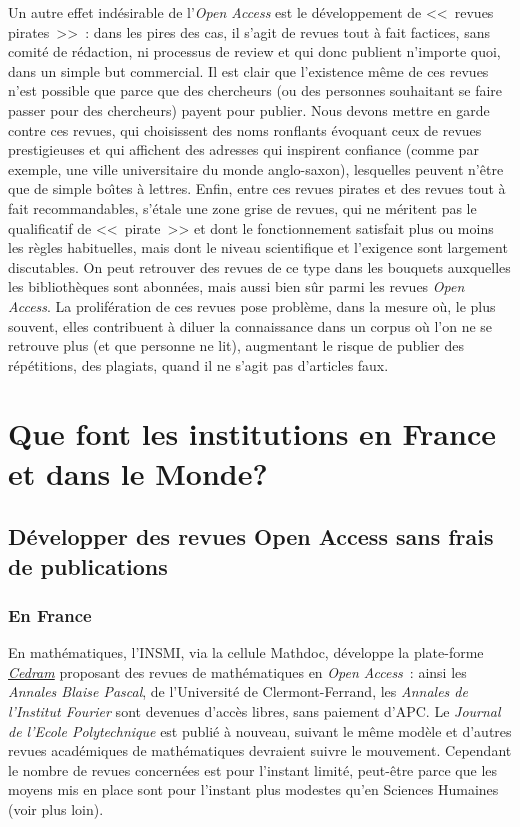 Un autre effet ind{\'e}sirable de l'\emph{Open Access} est le d{\'e}veloppement de <<~revues pirates~>>~: dans les pires des cas, il s'agit de revues tout {\`a} fait
factices, sans comit{\'e} de r{\'e}daction, ni processus de review et qui donc publient n'importe quoi, dans un simple but commercial. Il est clair que
l'existence m{\^e}me de ces revues n'est possible que parce que des chercheurs (ou des personnes souhaitant se faire passer pour des chercheurs) payent
pour publier. Nous devons mettre en garde contre ces revues, qui choisissent des noms ronflants {\'e}voquant ceux de revues prestigieuses et qui
affichent des adresses qui inspirent confiance (comme par exemple, une ville universitaire du
monde anglo-saxon), lesquelles peuvent n'{\^e}tre que de simple bo{\^\i}tes {\`a} lettres.
Enfin, entre ces revues pirates et des revues tout {\`a} fait recommandables, s'{\'e}tale une zone grise de revues, qui ne m{\'e}ritent pas le qualificatif
de <<~pirate~>> et dont le fonctionnement satisfait plus ou moins les r{\`e}gles habituelles, mais dont le niveau scientifique et l'exigence sont largement
discutables. On peut retrouver des revues de ce type dans les bouquets auxquelles les biblioth{\`e}ques sont abonn{\'e}es, mais aussi bien s{\^u}r parmi les revues
\emph{Open Access}. La prolif{\'e}ration de ces revues pose probl{\`e}me, dans la mesure o{\`u}, le plus souvent, elles contribuent {\`a} diluer la connaissance
dans un corpus o{\`u} l'on ne se retrouve plus (et que personne ne lit), augmentant le risque de publier des r{\'e}p{\'e}titions, des plagiats, quand il ne
s'agit pas d'articles faux.

\section{Que font les institutions en France et dans le Monde?}

\subsection{D{\'e}velopper des revues Open Access sans frais de publications}

\subsubsection{En France}

En math{\'e}matiques, l'INSMI, via la cellule Mathdoc, d{\'e}veloppe la plate-forme  \href{http://www.cedram.org}{\emph{Cedram}}
proposant des revues de math{\'e}matiques
en \emph{Open Access}~: ainsi les \emph{Annales Blaise Pascal}, de l'Universit{\'e} de Clermont-Ferrand,
les \emph{Annales de l'Institut Fourier} sont devenues d'acc{\`e}s libres,
sans paiement d'APC. Le \emph{Journal de l'Ecole Polytechnique} est publi{\'e} {\`a} nouveau, suivant le m{\^e}me mod{\`e}le et d'autres revues acad{\'e}miques de math{\'e}matiques
devraient suivre le mouvement. Cependant le nombre de revues concern{\'e}es est pour l'instant limit{\'e}, peut-{\^e}tre parce que les moyens mis en place sont pour
l'instant plus modestes qu'en Sciences Humaines (voir plus loin). 

